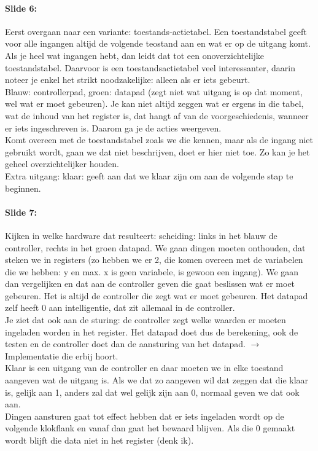 \documentclass[10pt,a4paper]{book}
\begin{document}
\paragraph{Slide 6:} Eerst overgaan naar een variante: toestands-actietabel. Een toestandstabel geeft voor alle ingangen altijd de volgende teostand aan en wat er op de uitgang komt. Als je heel wat ingangen hebt, dan leidt dat tot een onoverzichtelijke toestandstabel. Daarvoor is een toestandsactietabel veel interessanter, daarin noteer je enkel het strikt noodzakelijke: alleen als er iets gebeurt.\\
Blauw: controllerpad, groen: datapad (zegt niet wat uitgang is op dat moment, wel wat er moet gebeuren). Je kan niet altijd zeggen wat er ergens in die tabel, wat de inhoud van het register is, dat hangt af van de voorgeschiedenis, wanneer er iets ingeschreven is. Daarom ga je de acties weergeven.\\
Komt overeen met de toestandstabel zoals we die kennen, maar als de ingang niet gebruikt wordt, gaan we dat niet beschrijven, doet er hier niet toe. Zo kan je het geheel overzichtelijker houden.\\
Extra uitgang: klaar: geeft aan dat we klaar zijn om aan de volgende stap te beginnen. 

\paragraph{Slide 7:} Kijken in welke hardware dat resulteert: scheiding: links in het blauw de controller, rechts in het groen datapad. We gaan dingen moeten onthouden, dat steken we in registers (zo hebben we er 2, die komen overeen met de variabelen die we hebben: y en max. x is geen variabele, is gewoon een ingang). We gaan dan vergelijken en dat aan de controller geven die gaat beslissen wat er moet gebeuren. Het is altijd de controller die zegt wat er moet gebeuren. Het datapad zelf heeft 0 aan intelligentie, dat zit allemaal in de controller.\\
Je ziet dat ook aan de sturing: de controller zegt welke waarden er moeten ingeladen worden in het register. Het datapad doet dus de berekening, ook de testen en de controller doet dan de aansturing van het datapad. $\rightarrow$ Implementatie die erbij hoort.\\
Klaar is een uitgang van de controller en daar moeten we in elke toestand aangeven wat de uitgang is. Als we dat zo aangeven wil dat zeggen dat die klaar is, gelijk aan 1, anders zal dat wel gelijk zijn aan 0, normaal geven we dat ook aan.\\
Dingen aansturen gaat tot effect hebben dat er iets ingeladen wordt op de volgende klokflank en vanaf dan gaat het bewaard blijven. Als die 0 gemaakt wordt blijft die data niet in het register (denk ik).
\end{document}
